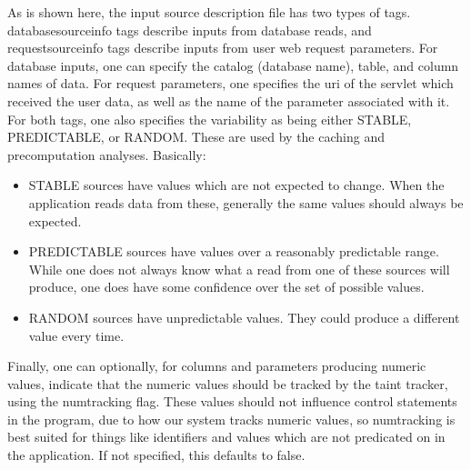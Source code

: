 \documentclass[msc,oneside]{ubcthesis}
\begin{document}
As is shown here, the input source description file has two types of tags. databasesourceinfo tags describe inputs from database reads, and requestsourceinfo tags describe inputs from user web request parameters. For database inputs, one can specify the catalog (database name), table, and column names of data. For request parameters, one specifies the uri of the servlet which received the user data, as well as the name of the parameter associated with it. \\

For both tags, one also specifies the variability as being either STABLE, PREDICTABLE, or RANDOM. These are used by the caching and precomputation analyses. Basically:
\begin{itemize}
\item STABLE sources have values which are not expected to change. When the application reads data from these, generally the same values should always be expected.
\item PREDICTABLE sources have values over a reasonably predictable range. While one does not always know what a read from one of these sources will produce, one does have some confidence over the set of possible values.
\item RANDOM sources have unpredictable values. They could produce a different value every time.
\end{itemize}

Finally, one can optionally, for columns and parameters producing numeric values, indicate that the numeric values should be tracked by the taint tracker, using the numtracking flag. These values should not influence control statements in the program, due to how our system tracks numeric values, so numtracking is best suited for things like identifiers and values which are not predicated on in the application. If not specified, this defaults to false.
\end{document}
